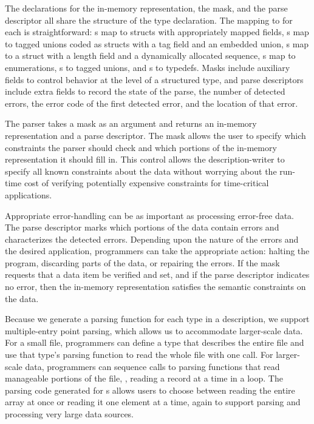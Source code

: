 The \C{} declarations for the in-memory representation, the mask, 
and the parse descriptor all share the structure of the \pads{}
type declaration.  The mapping to \C{} for each is straightforward: 
s map to \C{} structs with appropriately mapped fields, 
s map to tagged unions coded as \C{} structs with a tag field 
and an embedded 
union, s map to a \C{} struct with a length field and a 
dynamically allocated sequence, s map to \C{} enumerations, s 
to tagged unions, and s to \C{} typedefs.  Masks include
auxiliary fields to control behavior at the level of a structured
type, and parse descriptors include extra fields to record the 
state of the parse, the number of detected errors, 
the error code of the first detected error, and the location of that error.

The parser takes a mask as an argument and returns an
in-memory representation and a parse descriptor.  
The mask allows the user to specify 
which constraints the parser should check and which portions of the
in-memory representation it should fill in.  This control allows the
description-writer to specify all known constraints about the data
without worrying about the run-time cost of verifying potentially
expensive constraints for time-critical applications.

Appropriate error-handling can be as important as processing
error-free data.  The parse descriptor marks which portions of the
data contain errors and characterizes the detected errors.
Depending upon the nature of the errors and the desired application,
programmers can take the appropriate action: halting the program,
discarding parts of the data, or repairing the errors.
If the mask requests
that a data item be verified and set, and if the parse descriptor
indicates no error, then the in-memory representation satisfies the
semantic constraints on the data.

Because we generate a parsing function for each type in a \pads{} description,
we support multiple-entry point parsing, which allows us to 
accommodate larger-scale data.
For a small file, programmers can define a \pads{} type that describes
the entire file and use that type's parsing function to read the whole
file with one call.  For larger-scale data, programmers can sequence
calls to parsing functions that read manageable portions of the file,
\eg{}, reading a record at a time in a loop.  The parsing code generated
for s allows users to choose between reading the entire array
at once or reading it one element at a time, again to support parsing
and processing very large data sources.

